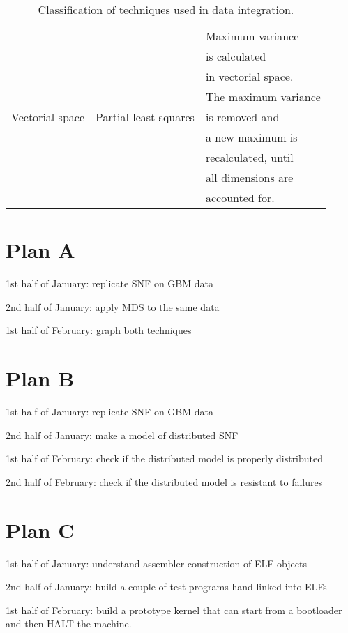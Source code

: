 \documentclass[11pt,a4paper,twoside,openright]{report}
\begin{document}
\begin{table}[hp]
\begin{tabular}{|l|l|l|}
\multirow{9}{0.2\textwidth}{Vectorial space}
& \multirow{9}{0.3\textwidth}{Partial least squares\cite{siongng2013}}
  & Maximum variance \\
& & is calculated \\
& & in vectorial space. \\
\cline{3-3}
& & The maximum variance \\
& & is removed and \\
& & a new maximum is \\
& & recalculated, until \\
& & all dimensions are \\
& & accounted for. \\

\bottomrule
\end{tabular}
\caption{Classification of techniques used in data integration.}
\label{tab:tech}
\end{table}

\clearpage{\pagestyle{empty}\cleardoublepage}



\appendix

\clearpage{\pagestyle{empty}\cleardoublepage}
\chapter{Plan A}

1st half of January: replicate SNF on GBM data

2nd half of January: apply MDS to the same data

1st half of February: graph both techniques

\clearpage{\pagestyle{empty}\cleardoublepage}
\chapter{Plan B}

1st half of January: replicate SNF on GBM data

2nd half of January: make a model of distributed SNF

1st half of February: check if the distributed model is properly distributed

2nd half of February: check if the distributed model is resistant to failures

\clearpage{\pagestyle{empty}\cleardoublepage}
\chapter{Plan C}

1st half of January: understand assembler construction of ELF objects

2nd half of January: build a couple of test programs hand linked into ELFs

1st half of February: build a prototype kernel that can start from a bootloader
and then HALT the machine.
\end{document}
